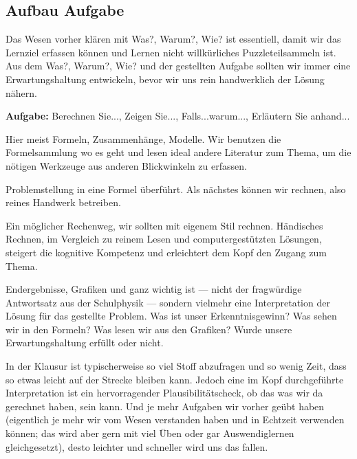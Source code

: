 \subsection*{Aufbau Aufgabe}
\begin{Ziel}
Das Wesen vorher klären mit Was?, Warum?, Wie? ist essentiell, damit wir das
Lernziel erfassen können und Lernen nicht willkürliches Puzzleteilsammeln ist.
Aus dem Was?, Warum?, Wie? und der gestellten Aufgabe sollten wir immer eine
Erwartungshaltung entwickeln, bevor wir uns rein handwerklich der Lösung nähern.
\end{Ziel}
\textbf{Aufgabe:} Berechnen Sie..., Zeigen Sie..., Falls...warum..., Erläutern
Sie anhand...
\begin{Werkzeug}
Hier meist Formeln, Zusammenhänge, Modelle. Wir benutzen die Formelsammlung
wo es geht und lesen ideal andere Literatur zum Thema, um die nötigen Werkzeuge
aus anderen Blickwinkeln zu erfassen.
\end{Werkzeug}
\begin{Ansatz}
Problemstellung in eine Formel überführt. Als nächstes können wir rechnen, also
reines Handwerk betreiben.
\end{Ansatz}
\begin{ExCalc}
Ein möglicher Rechenweg, wir sollten mit eigenem Stil
rechnen.
Händisches Rechnen, im Vergleich zu reinem Lesen und computergestützten Lösungen,
steigert die kognitive Kompetenz und erleichtert dem Kopf den Zugang zum Thema.
\end{ExCalc}
\begin{Loesung}
Endergebnisse, Grafiken und ganz wichtig ist --- nicht der fragwürdige Antwortsatz
aus der Schulphysik --- sondern vielmehr eine Interpretation der Lösung
für das gestellte Problem. Was ist unser Erkenntnisgewinn? Was sehen wir in den
Formeln? Was lesen wir aus den Grafiken? Wurde unsere Erwartungshaltung erfüllt
oder nicht.

In der Klausur ist typischerweise so viel Stoff abzufragen und so wenig Zeit,
dass so etwas leicht auf der Strecke bleiben kann. Jedoch eine im Kopf
durchgeführte Interpretation ist ein hervorragender Plausibilitätscheck, ob das was
wir da gerechnet haben, sein kann. Und je mehr Aufgaben wir
vorher geübt haben (eigentlich je mehr wir vom Wesen verstanden haben und in
Echtzeit verwenden können; das wird aber gern mit viel Üben oder gar
Auswendiglernen gleichgesetzt),
desto leichter und schneller wird uns das fallen.
\end{Loesung}
